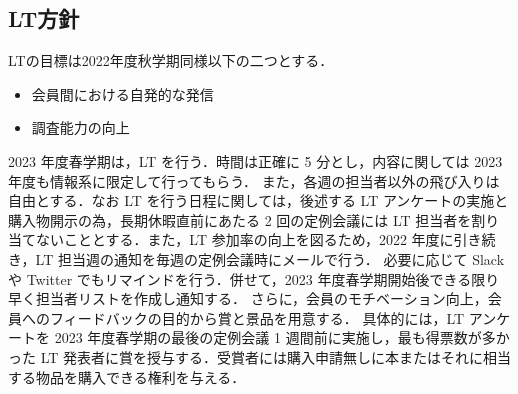 \subsection*{LT方針}


LTの目標は2022年度秋学期同様以下の二つとする．
\begin{itemize}
    \item 会員間における自発的な発信
    \item 調査能力の向上
\end{itemize}
2023 年度春学期は\secondGrade， LT を行う．時間は正確に 5 分とし，内容に関しては 2023 年度も情報系に限定して行ってもらう．
また，各週の担当者以外の飛び入りは自由とする．なお LT を行う日程に関しては，後述する LT アンケートの実施と購入物開示の為，長期休暇直前にあたる 2 回の定例会議には LT 担当者を割り当てないこととする．また，LT 参加率の向上を図るため，2022 年度に引き続き，LT 担当週の通知を毎週の定例会議時にメールで行う．
必要に応じて Slack や Twitter でもリマインドを行う．併せて，2023 年度春学期開始後できる限り早く担当者リストを作成し通知する．
さらに，会員のモチベーション向上，会員へのフィードバックの目的から賞と景品を用意する．
具体的には，LT アンケートを 2023 年度春学期の最後の定例会議 1 週間前に実施し，最も得票数が多かった LT 発表者に賞を授与する．受賞者には購入申請無しに本またはそれに相当する物品を購入できる権利を与える．
